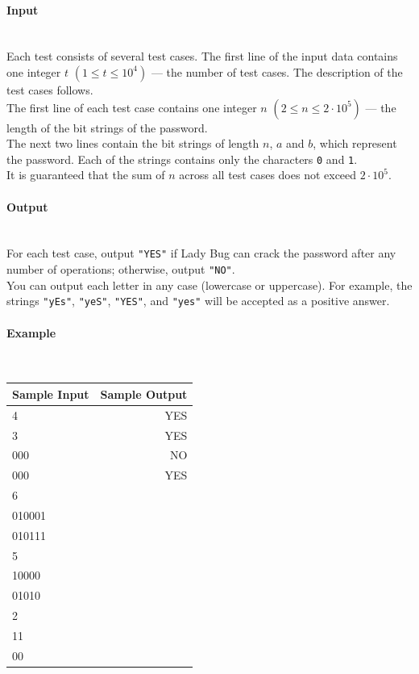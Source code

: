 \documentclass{article}
\begin{document}
\paragraph{Input} \mbox{} \\

Each test consists of several test cases. The first line of the input data contains one integer $t$ $(1 \le t \le 10^4)$ — the number of test cases. The description of the test cases follows.\\

The first line of each test case contains one integer $n$ $(2 \le n \le 2 \cdot 10^5)$ — the length of the bit strings of the password.\\

The next two lines contain the bit strings of length $n$, $a$ and $b$, which represent the password. Each of the strings contains only the characters \texttt{0} and \texttt{1}.\\

It is guaranteed that the sum of $n$ across all test cases does not exceed $2 \cdot 10^5$.


\paragraph{Output}\mbox{} \\

For each test case, output \texttt{"YES"} if Lady Bug can crack the password after any number of operations; otherwise, output \texttt{"NO"}.\\

You can output each letter in any case (lowercase or uppercase). For example, the strings \texttt{"yEs"}, \texttt{"yeS"}, \texttt{"YES"}, and \texttt{"yes"} will be accepted as a positive answer.

\paragraph{Example}\mbox{} \\

\begin{table}[h]
    \centering
    \begin{tabular}{|l|r|}
        \hline
        \textbf{Sample Input} & \textbf{Sample Output} \\
        \hline
        4 & YES \\
        3 & YES \\
        000 & NO \\
        000 & YES \\
        6 & \\
        010001 & \\
        010111 & \\
        5 & \\
        10000 & \\
        01010 & \\
        2 & \\
        11 & \\
        00 & \\
        \hline
    \end{tabular}
\end{table}
\end{document}
